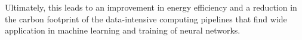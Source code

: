 
Ultimately, this leads to an improvement in energy efficiency and a reduction in the carbon footprint of the data-intensive computing pipelines that find wide application in machine learning and training of neural networks.
